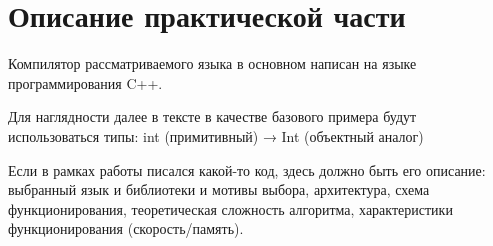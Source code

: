 \section{Описание практической части}
\label{sec:Chapter4} 

Компилятор рассматриваемого языка в основном написан на языке программирования C++.

Для наглядности далее в тексте в качестве базового примера будут использоваться типы:
int (примитивный) → Int (объектный аналог)

Если в рамках работы писался какой-то код, здесь должно быть его
описание: выбранный язык и библиотеки и мотивы выбора, архитектура,
схема функционирования, теоретическая сложность алгоритма, характеристики
функционирования (скорость/память).

\newpage
